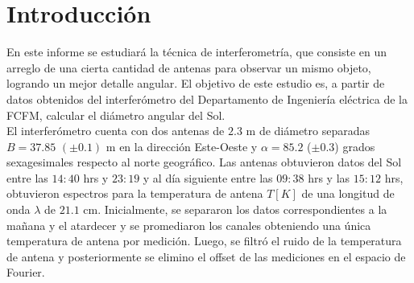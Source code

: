 \documentclass[letterpaper,oneside]{article}
\begin{document}
	
\templatePortrait

\templatePagecfg

%
%

\templateFinalcfg


\section{Introducción}
En este informe se estudiará la técnica de interferometría, que consiste en un arreglo de una cierta cantidad de antenas para observar un mismo objeto, logrando un mejor detalle angular. El objetivo de este estudio es, a partir de datos obtenidos del interferómetro del Departamento de Ingeniería eléctrica de la FCFM, calcular el diámetro angular del Sol.\\

El interferómetro cuenta con dos antenas de $2.3$ m de diámetro separadas $B = 37.85$ $(\pm 0.1)$ m en la dirección Este-Oeste  y $\alpha = 85.2$ ($\pm 0.3$) grados sexagesimales respecto al norte geográfico. Las antenas obtuvieron datos del Sol entre las $14:40$ hrs y $23:19$ y al día siguiente entre las $09:38$ hrs y las $15:12$ hrs, obtuvieron espectros para la temperatura de antena $T [K]$ de una longitud de onda $\lambda$ de $21.1$ cm. Inicialmente, se separaron los datos correspondientes a la mañana y el atardecer y se promediaron los canales obteniendo una única temperatura de antena por medición. Luego, se filtró el ruido de la temperatura de antena y posteriormente se elimino el offset de las mediciones en el espacio de Fourier.\\
\end{document}
